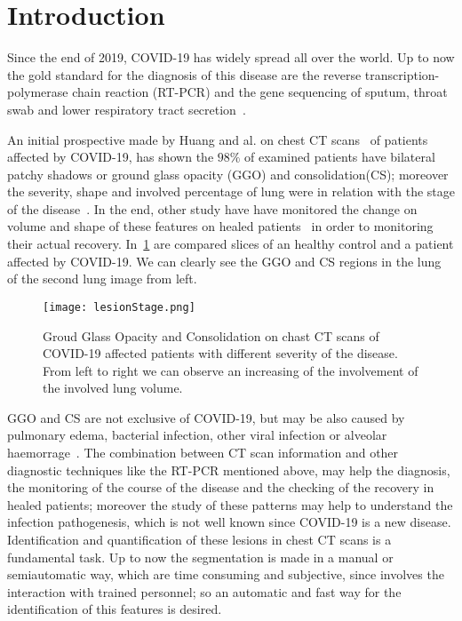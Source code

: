 \documentclass{standalone}
\begin{document}
\chapter*{Introduction}


Since the end of 2019, COVID-19 has widely spread all over the world. Up to now the gold standard for the diagnosis of this disease are the reverse transcription-polymerase chain reaction (RT-PCR) and the gene sequencing of sputum, throat swab and lower respiratory tract secretion~\cite{ART:Zhao}.

An initial prospective made by Huang and al. on chest CT scans~\cite{ART:Huang} of patients affected by COVID-19, has shown the $98\%$ of examined patients have bilateral patchy shadows or ground glass opacity (GGO) and consolidation(CS); moreover the severity, shape and involved percentage of lung were in relation with the stage of the disease~\cite{ART:Bernheim}. In the end, other study have have monitored the change on volume and shape of these features on healed patients~\cite{ART:Ai} in order to monitoring their actual recovery. In \figurename\,\ref{fig:HealthVSCovid} are compared slices of an healthy control and a patient affected by COVID-19. We can clearly see the GGO and CS regions in the lung of the second lung image from left.
	
\begin{figure}[h!]
	\centering
	\texttt{[image: lesionStage.png]}
	\caption{Groud Glass Opacity and Consolidation on chast CT scans of COVID-19 affected patients with different severity of the disease. From left to right we can observe an increasing of the involvement of the involved lung volume.}\label{fig:HealthVSCovid}
\end{figure} 

GGO and CS are not exclusive of COVID-19, but may be also caused by pulmonary edema, bacterial infection, other viral infection or alveolar haemorrage~\cite{ART:Collins}. The combination between CT scan information and other diagnostic techniques like the RT-PCR mentioned above, may help the diagnosis, the monitoring of the course of the disease and the checking of the recovery in healed patients; moreover the study of these patterns may help to understand the infection pathogenesis, which is not well known since COVID-19 is a new disease.\\

Identification and quantification of these lesions in chest CT scans is a fundamental task. Up to now the segmentation is made in a manual or semiautomatic way, which are time consuming and subjective, since involves the interaction with trained personnel;  so an automatic and fast way for the identification of this features is desired.
\end{document}
